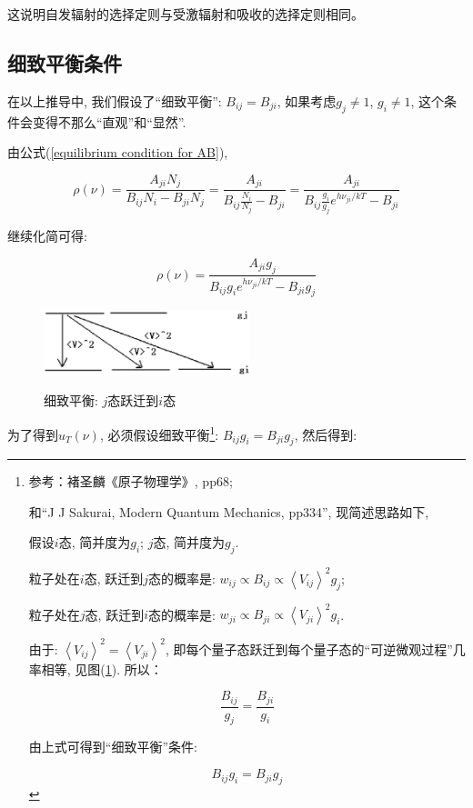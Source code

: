 这说明自发辐射的选择定则与受激辐射和吸收的选择定则相同。


\subsection*{细致平衡条件}

在以上推导中, 我们假设了``细致平衡'': $B_{ij}=B_{ji}$, 如果考虑$g_j
\ne 1$, $g_i \ne 1$, 这个条件会变得不那么``直观''和``显然''.



由公式(\ref{equilibrium condition for AB}),

\begin{equation*}
\rho(\nu)=\frac{A_{ji}N_j}{B_{ij}N_i -
B_{ji}N_j}=\frac{A_{ji}}{B_{ij}\frac{N_i}{N_j}-B_{ji}}=\frac{A_{ji}}{B_{ij}\frac{g_i}{g_j}e^{h\nu_{ji}/kT}-B_{ji}}
\end{equation*}

继续化简可得:

\begin{equation*}
\rho(\nu)=\frac{A_{ji}g_j}{B_{ij}g_ie^{h\nu_{ji}/kT}-B_{ji}g_j}
\end{equation*}



\begin{figure}[h]
\begin{center}
  \includegraphics[width=6cm]{Spectrum/detailed_balancing_gij.ps}\\
  \caption{细致平衡: $j$态跃迁到$i$态}\label{detailed balancing graph}
\end{center}
\end{figure}

为了得到$u_T(\nu)$,
必须假设细致平衡\footnote{参考：褚圣麟《原子物理学》, pp68;

和``J J Sakurai, Modern Quantum Mechanics, pp334'', 现简述思路如下,

假设$i$态, 简并度为$g_i$; $j$态, 简并度为$g_j$.

粒子处在$i$态, 跃迁到$j$态的概率是: $w_{ij} \propto B_{ij} \propto
\left\langle V_{ij} \right\rangle^2 g_j$;

粒子处在$j$态, 跃迁到$i$态的概率是: $w_{ji} \propto B_{ji} \propto
\left\langle V_{ji} \right\rangle^2 g_i$.

由于: $\left\langle V_{ij}\right\rangle^2 = \left\langle
V_{ji}\right\rangle^2$,
即每个量子态跃迁到每个量子态的``可逆微观过程''几率相等,
见图(\ref{detailed balancing graph}). 所以：

\begin{equation*}
\frac{B_{ij}}{g_j} = \frac{B_{ji}}{g_i}
\end{equation*}

由上式可得到``细致平衡''条件:

\begin{equation*}
B_{ij}g_i = B_{ji}g_j
\end{equation*}}: $B_{ij}g_i = B_{ji}g_j$, 然后得到:


